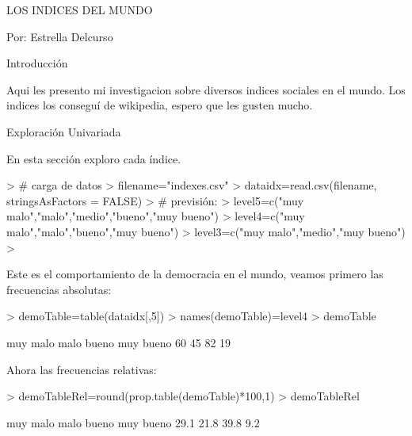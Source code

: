 \documentclass{article}
\begin{document}


LOS INDICES DEL MUNDO


Por: Estrella Delcurso


Introducción

Aqui les presento mi investigacion sobre diversos indices sociales en el mundo. Los indices los conseguí de wikipedia, espero que les gusten mucho.


Exploración Univariada

En esta sección exploro cada índice.




\begin{Schunk}
\begin{Sinput}
> # carga de datos
> filename="indexes.csv"
> dataidx=read.csv(filename, stringsAsFactors = FALSE)
> # previsión:
> level5=c("muy malo","malo","medio","bueno","muy bueno")
> level4=c("muy malo","malo","bueno","muy bueno")
> level3=c("muy malo","medio","muy bueno")
> 
\end{Sinput}
\end{Schunk}


Este es el comportamiento de la democracia en el mundo, veamos primero las frecuencias absolutas:
\begin{Schunk}
\begin{Sinput}
> demoTable=table(dataidx[,5])
> names(demoTable)=level4
> demoTable
\end{Sinput}
\begin{Soutput}
 muy malo      malo     bueno muy bueno 
       60        45        82        19 
\end{Soutput}
\end{Schunk}

Ahora las frecuencias relativas:
\begin{Schunk}
\begin{Sinput}
> demoTableRel=round(prop.table(demoTable)*100,1)
> demoTableRel
\end{Sinput}
\begin{Soutput}
 muy malo      malo     bueno muy bueno 
     29.1      21.8      39.8       9.2 
\end{Soutput}
\end{Schunk}
\end{document}
